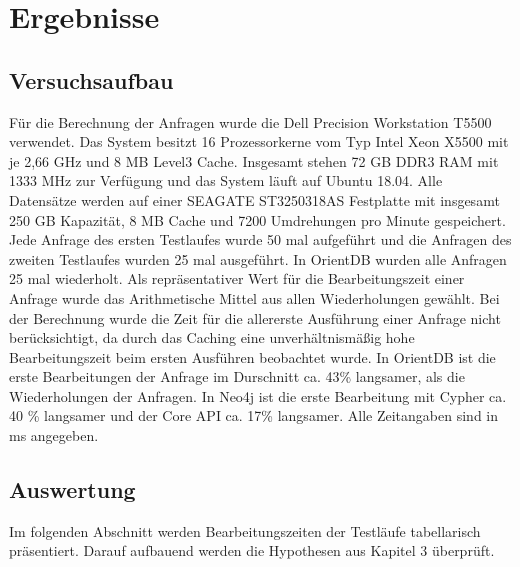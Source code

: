 
\chapter{Ergebnisse} %

\label{Kaptiel4} %

\section{Versuchsaufbau}
Für die Berechnung der Anfragen wurde die Dell Precision Workstation T5500 verwendet. Das System besitzt 16 Prozessorkerne vom Typ Intel Xeon  X5500 mit je 2,66 GHz und  8 MB Level3 Cache. Insgesamt stehen 72 GB DDR3 RAM mit 1333 MHz zur Verfügung und das System läuft auf Ubuntu 18.04. Alle Datensätze werden auf einer SEAGATE ST3250318AS Festplatte mit insgesamt 250 GB Kapazität, 8 MB Cache und 7200 Umdrehungen pro Minute gespeichert.\newline
 Jede Anfrage des ersten Testlaufes wurde 50 mal aufgeführt und die Anfragen des zweiten Testlaufes wurden 25 mal ausgeführt. In OrientDB wurden alle Anfragen 25 mal wiederholt. Als repräsentativer Wert für die Bearbeitungszeit einer Anfrage  wurde das Arithmetische Mittel aus allen Wiederholungen gewählt. Bei der Berechnung wurde die Zeit für die allererste Ausführung einer Anfrage nicht berücksichtigt, da durch das Caching eine unverhältnismäßig hohe Bearbeitungszeit beim ersten Ausführen beobachtet wurde. In OrientDB ist die erste Bearbeitungen der Anfrage im Durschnitt ca. 43\% langsamer, als die Wiederholungen  der Anfragen. In Neo4j ist die erste Bearbeitung mit Cypher ca. 40 \% langsamer und der Core API ca. 17\% langsamer.  Alle Zeitangaben sind in ms angegeben. 
\section{Auswertung}
Im folgenden Abschnitt werden Bearbeitungszeiten der Testläufe tabellarisch präsentiert.  Darauf aufbauend werden die Hypothesen aus Kapitel 3 überprüft.  
